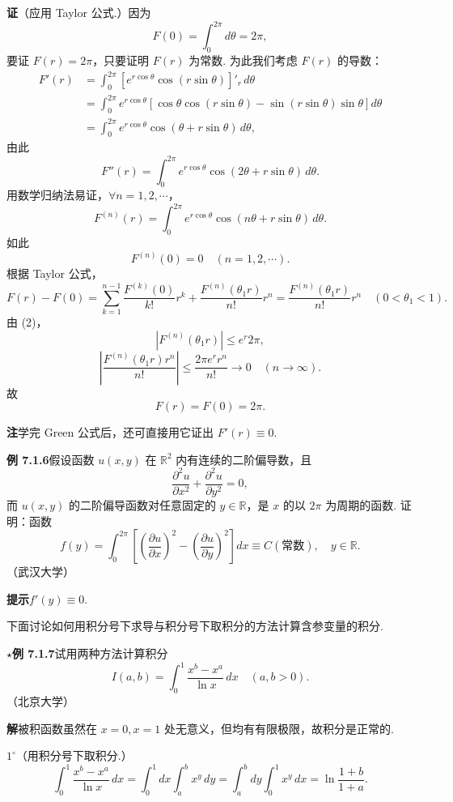 \documentclass[UTF8, 12pt, fontset=fandol, oneside]{ctexart}
\begin{document}
\noindent\textbf{证}\quad （应用 Taylor 公式.）因为
\[
F(0)=\int_0^{2\pi}d\theta=2\pi,
\]
要证 $F(r)=2\pi$，只要证明 $F(r)$ 为常数. 为此我们考虑 $F(r)$ 的导数：
\begin{equation}
\begin{aligned}
F'(r)
&=\int_0^{2\pi}\left[e^{r\cos\theta}\cos(r\sin\theta)\right]'_r\,d\theta\\
&=\int_0^{2\pi}e^{r\cos\theta}
\left[\cos\theta\cos(r\sin\theta)-\sin(r\sin\theta)\sin\theta\right]d\theta\\
&=\int_0^{2\pi}e^{r\cos\theta}\cos(\theta+r\sin\theta)\,d\theta,
\end{aligned}
\tag{1}
\end{equation}
由此
\[
F''(r)=\int_0^{2\pi}e^{r\cos\theta}\cos(2\theta+r\sin\theta)\,d\theta.
\]
用数学归纳法易证，$\forall n=1,2,\cdots$，
\begin{equation}
F^{(n)}(r)=\int_0^{2\pi}e^{r\cos\theta}\cos(n\theta+r\sin\theta)\,d\theta.
\tag{2}
\end{equation}
如此
\[
F^{(n)}(0)=0\quad(n=1,2,\cdots).
\]
根据 Taylor 公式，
\[
F(r)-F(0)=\sum_{k=1}^{n-1}\frac{F^{(k)}(0)}{k!}r^k
+\frac{F^{(n)}(\theta_1r)}{n!}r^n
=\frac{F^{(n)}(\theta_1r)}{n!}r^n\quad(0<\theta_1<1).
\]
由 (2)，
\[
|F^{(n)}(\theta_1r)|\le e^r2\pi,
\]
\[
\left|\frac{F^{(n)}(\theta_1r)r^n}{n!}\right|
\le\frac{2\pi e^r r^n}{n!}\to0\quad(n\to\infty).
\]
故
\[
F(r)=F(0)=2\pi.
\]

\noindent\textbf{注}\quad 学完 Green 公式后，还可直接用它证出 $F'(r)\equiv0$.

\noindent\textbf{例 7.1.6}\quad 假设函数 $u(x,y)$ 在 $\mathbb{R}^2$ 内有连续的二阶偏导数，且
\[
\frac{\partial^2u}{\partial x^2}+\frac{\partial^2u}{\partial y^2}=0,
\]
而 $u(x,y)$ 的二阶偏导函数对任意固定的 $y\in\mathbb{R}$，是 $x$ 的以 $2\pi$ 为周期的函数. 证明：函数
\[
f(y)=\int_0^{2\pi}\left[\left(\frac{\partial u}{\partial x}\right)^2
-\left(\frac{\partial u}{\partial y}\right)^2\right]dx
\equiv C(\text{常数}),\quad y\in\mathbb{R}.
\]
（武汉大学）

\noindent\textbf{提示}\quad $f'(y)\equiv0$.

下面讨论如何用积分号下求导与积分号下取积分的方法计算含参变量的积分.

\noindent\textbf{$\star$例 7.1.7}\quad 试用两种方法计算积分
\[
I(a,b)=\int_0^1\frac{x^b-x^a}{\ln x}\,dx\quad(a,b>0).
\]
（北京大学）

\noindent\textbf{解}\quad 被积函数虽然在 $x=0,x=1$ 处无意义，但均有有限极限，故积分是正常的.

$1^\circ$（用积分号下取积分.）
\[
\int_0^1\frac{x^b-x^a}{\ln x}\,dx
=\int_0^1dx\int_a^b x^y\,dy
=\int_a^bdy\int_0^1x^y\,dx
=\ln\frac{1+b}{1+a}.
\]
\end{document}
